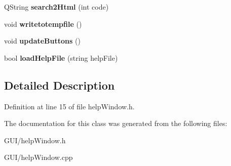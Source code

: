 \begin{DoxyCompactItemize}
Q\+String {\bfseries search2\+Html} (int code)
\item 
\mbox{\label{classhelp_window_a36de5c1541b6cd9cd16b7a276cfc94f1}} 
void {\bfseries writetotempfile} ()
\item 
\mbox{\label{classhelp_window_a317c88bd43a80ffa7705ea5226bbccdb}} 
void {\bfseries update\+Buttons} ()
\item 
\mbox{\label{classhelp_window_a8c0739a430dfb39a485515912bd02c61}} 
bool {\bfseries load\+Help\+File} (string help\+File)
\end{DoxyCompactItemize}


\subsection{Detailed Description}


Definition at line 15 of file help\+Window.\+h.



The documentation for this class was generated from the following files\+:\begin{DoxyCompactItemize}
\item 
G\+U\+I/help\+Window.\+h\item 
G\+U\+I/help\+Window.\+cpp\end{DoxyCompactItemize}
